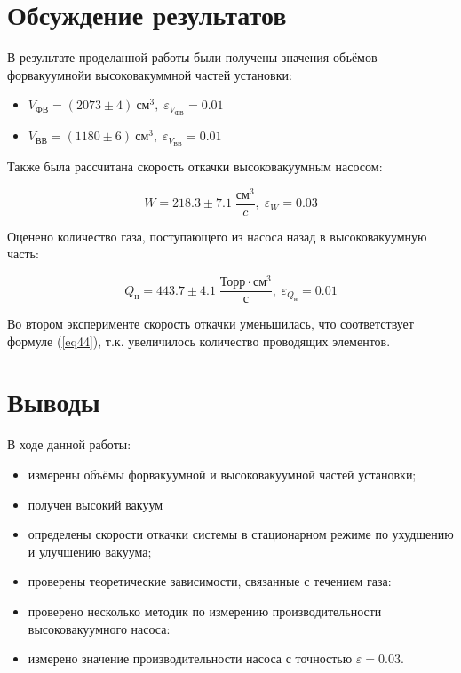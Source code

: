 \documentclass{article}
\newcommand{\x}{\text}
\begin{document}
\section*{Обсуждение результатов}

В результате проделанной работы были получены значения объёмов форвакуумнойи высоковакуммной частей установки:
\begin{itemize}
    \item $V_\text{ФВ} = (2073\pm4)~\text{см}^3, \; \varepsilon_{V_\text{ФВ}} = 0.01$
    \item $V_\text{ВВ} = (1180\pm6)~\text{см}^3, \; \varepsilon_{V_\text{ВВ}} = 0.01$
\end{itemize}

Также была рассчитана скорость откачки высоковакуумным насосом:

$$W = 218.3\pm7.1  \; \frac{\x{см}^3}{c}, \; \varepsilon_W = 0.03$$

Оценено количество газа, поступающего из насоса назад в высоковакуумную часть:

$$Q_\x{н} = 443.7\pm4.1 \; \frac{\x{Торр}\cdot\x{см}^3}{\x{с}}, \; \varepsilon_{Q_\text{н}} = 0.01$$

Во втором эксперименте скорость откачки уменьшилась, что соответствует формуле (\ref{eq44}), т.к. увеличилось количество проводящих элементов.

\section*{Выводы}

В ходе данной работы:

\begin{itemize}
    \item измерены объёмы форвакуумной и высоковакуумной частей установки;
    \item получен высокий вакуум
    \item определены скорости откачки системы в стационарном режиме по ухудшению и улучшению вакуума;
    \item проверены теоретические зависимости, связанные с течением газа:
    \item проверено несколько методик по измерению производительности высоковакуумного насоса:
    \item измерено значение производительности насоса с точностью $\varepsilon = 0.03$.
\end{itemize}
\end{document}
